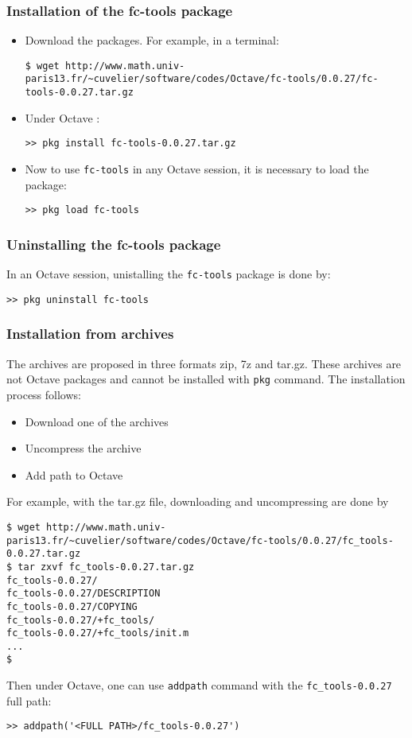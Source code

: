 \subsubsection{Installation of the fc-tools package}

\begin{itemize}
\item Download the packages. For example, in a terminal:
\begin{verbatim}
$ wget http://www.math.univ-paris13.fr/~cuvelier/software/codes/Octave/fc-tools/0.0.27/fc-tools-0.0.27.tar.gz
\end{verbatim}
\item Under Octave :
\begin{verbatim}
>> pkg install fc-tools-0.0.27.tar.gz
\end{verbatim}
\item Now to use \texttt{fc-tools} in any Octave session, it is necessary to load the package:
\begin{verbatim}
>> pkg load fc-tools
\end{verbatim}
\end{itemize}

\subsubsection{Uninstalling the fc-tools package}
In an Octave session, unistalling the \texttt{fc-tools} package is done by:
\begin{verbatim}
>> pkg uninstall fc-tools
\end{verbatim}

\subsubsection{Installation from archives}
The archives are proposed in three formats zip, 7z and tar.gz. These archives are not Octave packages and cannot be installed with \texttt{pkg} command.
The installation process follows:
\begin{itemize}
\item Download one of the archives
\item Uncompress the archive
\item Add path to Octave
\end{itemize}

For example, with the tar.gz file, downloading and uncompressing are done by 
\begin{verbatim}
$ wget http://www.math.univ-paris13.fr/~cuvelier/software/codes/Octave/fc-tools/0.0.27/fc_tools-0.0.27.tar.gz
$ tar zxvf fc_tools-0.0.27.tar.gz
fc_tools-0.0.27/
fc_tools-0.0.27/DESCRIPTION
fc_tools-0.0.27/COPYING
fc_tools-0.0.27/+fc_tools/
fc_tools-0.0.27/+fc_tools/init.m
...
$
\end{verbatim}
Then under Octave, one can use \texttt{addpath} command with the \texttt{fc_tools-0.0.27} full path:
\begin{verbatim}
>> addpath('<FULL PATH>/fc_tools-0.0.27')
\end{verbatim}
 
